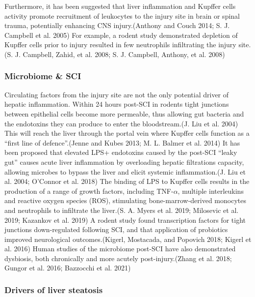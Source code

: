 \documentclass[9pt,lineno]{elife}
\begin{document}
\begin{landscape}
\begin{landscape}
Furthermore, it has been suggested that liver inflammation and Kupffer cells activity promote recruitment of leukocytes to the injury site in brain or spinal trauma, potentially enhancing CNS injury.(Anthony and Couch 2014; S. J. Campbell et al. 2005) For example, a rodent study demonstrated depletion of Kupffer cells prior to injury resulted in few neutrophils infiltrating the injury site.(S. J. Campbell, Zahid, et al. 2008; S. J. Campbell, Anthony, et al. 2008)

\hypertarget{microbiome-sci}{%
\subsubsection{Microbiome \& SCI}\label{microbiome-sci}}

Circulating factors from the injury site are not the only potential driver of hepatic inflammation.
Within 24 hours post-SCI in rodents tight junctions between epithelial cells become more permeable, thus allowing gut bacteria and the endotoxins they can produce to enter the bloodstream.(J. Liu et al. 2004) This will reach the liver through the portal vein where Kupffer cells function as a ``first line of defence''.(Jenne and Kubes 2013; M. L. Balmer et al. 2014) It has been proposed that elevated LPS+ endotoxins caused by the post-SCI ``leaky gut'' causes acute liver inflammation by overloading hepatic filtrations capacity, allowing microbes to bypass the liver and elicit systemic inflammation.(J. Liu et al. 2004; O'Connor et al. 2018) The binding of LPS to Kupffer cells results in the production of a range of growth factors, including TNF-\(\alpha\), multiple interleukins and reactive oxygen species (ROS), stimulating bone-marrow-derived monocytes and neutrophils to infiltrate the liver.(S. A. Myers et al. 2019; Milosevic et al. 2019; Kazankov et al. 2019) A rodent study found transcription factors for tight junctions down-regulated following SCI, and that application of probiotics improved neurological outcomes.(Kigerl, Mostacada, and Popovich 2018; Kigerl et al. 2016) Human studies of the microbiome post-SCI have also demonstrated dysbiosis, both chronically and more acutely post-injury.(Zhang et al. 2018; Gungor et al. 2016; Bazzocchi et al. 2021)

\hypertarget{drivers-of-liver-steatosis}{%
\subsubsection{Drivers of liver steatosis}\label{drivers-of-liver-steatosis}}


\end{landscape}
\end{landscape}
\end{document}
